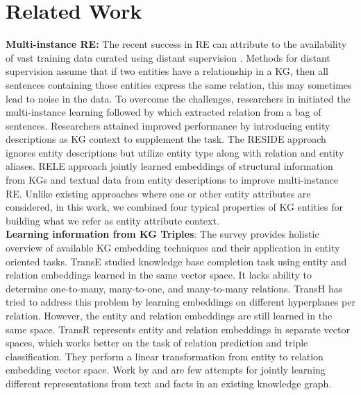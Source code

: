 \documentclass[sigconf]{acmart}
\begin{document}
\section{Related Work} \label{sec:related}
\par \textbf{Multi-instance RE:} The recent success in RE can attribute to the availability of vast training data curated using distant supervision \cite{DBLP:conf/acl/MintzBSJ09}. Methods for distant supervision assume that if two entities have a relationship in a KG, then all sentences containing those entities express the same relation, this may sometimes lead to noise in the data. To overcome the challenges, researchers in \cite{DBLP:conf/pkdd/RiedelYM10} initiated the multi-instance learning followed by \cite{DBLP:conf/acl/HoffmannZLZW11} which extracted relation from a
bag of sentences. 
Researchers \cite{DBLP:conf/aaai/Ji0H017} attained improved performance by introducing entity descriptions as KG context to supplement the task. The RESIDE approach \cite{DBLP:conf/emnlp/VashishthJPBT18} ignores entity descriptions but utilize entity type along with relation and entity aliases. RELE approach \cite{DBLP:conf/emnlp/HuZSNGY19} jointly learned embeddings of structural information from KGs and textual data from entity descriptions to improve multi-instance RE. Unlike existing approaches where one or other entity attributes are considered, in this work, we combined four typical properties of KG entities for building what we refer as entity attribute context. \\
\textbf{Learning information from KG Triples}: The survey \cite{wang2017knowledge} provides holistic overview of available KG embedding techniques and their application in entity oriented tasks. TransE \cite{DBLP:conf/nips/BordesUGWY13} studied knowledge base completion task using entity and relation embeddings learned in the same vector space. It lacks ability to determine one-to-many, many-to-one, and many-to-many relations. TransH \cite{DBLP:conf/aaai/WangZFC14} has tried to address this problem by learning embeddings on different hyperplanes per relation. However, the entity and relation embeddings are still learned in the same space. TransR \cite{DBLP:conf/aaai/LinLSLZ15} represents entity and relation embeddings in separate vector spaces, which works better on the task of relation prediction and triple classification. They perform a linear transformation from entity to relation embedding vector space. Work by \cite{DBLP:conf/naacl/XuB19} and \cite{DBLP:conf/aaai/Han0S18} are few attempts for jointly learning different representations from text and facts in an existing knowledge graph.
\end{document}
